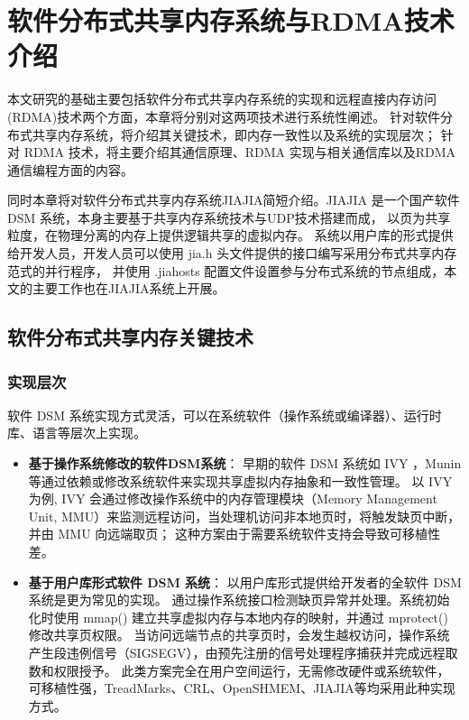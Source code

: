 \chapter{软件分布式共享内存系统与RDMA技术介绍}\label{chap:sdsm}{
    本文研究的基础主要包括软件分布式共享内存系统的实现和远程直接内存访问(RDMA)技术两个方面，本章将分别对这两项技术进行系统性阐述。
    针对软件分布式共享内存系统，将介绍其关键技术，即内存一致性以及系统的实现层次；
    针对 RDMA 技术，将主要介绍其通信原理、RDMA 实现与相关通信库以及RDMA通信编程方面的内容。

    同时本章将对软件分布式共享内存系统JIAJIA简短介绍。JIAJIA 是一个国产软件 DSM 系统，本身主要基于共享内存系统技术与UDP技术搭建而成，
    以页为共享粒度，在物理分离的内存上提供逻辑共享的虚拟内存。
    系统以用户库的形式提供给开发人员，开发人员可以使用 jia.h 头文件提供的接口编写采用分布式共享内存范式的并行程序，
    并使用 .jiahosts 配置文件设置参与分布式系统的节点组成，本文的主要工作也在JIAJIA系统上开展。

    \section{软件分布式共享内存关键技术}\label{软件分布式共享内存关键技术}

    \subsection{实现层次}\label{sec:implementations}
    软件 DSM 系统实现方式灵活，可以在系统软件（操作系统或编译器）、运行时库、语言等层次上实现。
    \begin{itemize}
        \item \textbf{基于操作系统修改的软件DSM系统}：
              早期的软件 DSM 系统如 IVY\citep{likai1988ivy} ，Munin\citep{bennett1990munin}等通过依赖或修改系统软件来实现共享虚拟内存抽象和一致性管理。
              以 IVY 为例, IVY 会通过修改操作系统中的内存管理模块（Memory Management Unit, MMU）来监测远程访问，当处理机访问非本地页时，将触发缺页中断，并由 MMU 向远端取页；
              这种方案由于需要系统软件支持会导致可移植性差。

        \item \textbf{基于用户库形式软件 DSM 系统}：
              以用户库形式提供给开发者的全软件 DSM 系统是更为常见的实现。
              通过操作系统接口检测缺页异常并处理。系统初始化时使用 mmap() 建立共享虚拟内存与本地内存的映射，并通过 mprotect() 修改共享页权限。
              当访问远端节点的共享页时，会发生越权访问，操作系统产生段违例信号（SIGSEGV），由预先注册的信号处理程序捕获并完成远程取数和权限授予。
              此类方案完全在用户空间运行，无需修改硬件或系统软件，可移植性强，TreadMarks、CRL、OpenSHMEM、JIAJIA等均采用此种实现方式。


\end{itemize}}
